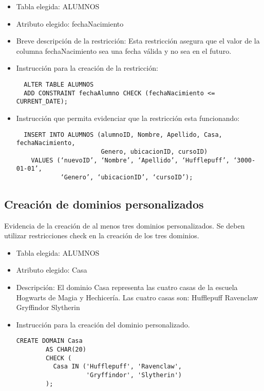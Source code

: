 \begin{itemize} 
  \item Tabla elegida: ALUMNOS 
  \item Atributo elegido: fechaNacimiento 
  \item Breve descripción de la restricción: Esta restricción asegura que el valor de la columna fechaNacimiento sea una fecha válida y no sea en el futuro.
  \item Instrucción para la creación de la restricción: 
  \begin{verbatim} 
  ALTER TABLE ALUMNOS 
  ADD CONSTRAINT fechaAlumno CHECK (fechaNacimiento <= CURRENT_DATE); 
  \end{verbatim} 
  \item Instrucción que permita evidenciar que la restricción esta funcionando: 
  \begin{verbatim} 
  INSERT INTO ALUMNOS (alumnoID, Nombre, Apellido, Casa, fechaNacimiento, 
                       Genero, ubicacionID, cursoID) 
    VALUES (‘nuevoID’, ‘Nombre’, ‘Apellido’, ‘Hufflepuff’, ‘3000-01-01’, 
            ‘Genero’, ‘ubicacionID’, ‘cursoID’); 
  \end{verbatim} 
\end{itemize}


\subsection{Creación de dominios personalizados}

Evidencia de la creación de al menos tres dominios personalizados. Se deben utilizar restricciones check en la creación de los tres dominios.
\begin{itemize}
    \item Tabla elegida: ALUMNOS
    \item Atributo elegido: Casa
    \item Descripción: El dominio Casa representa las cuatro casas de la escuela Hogwarts de Magia y Hechicería. Las cuatro casas son: Hufflepuff Ravenclaw Gryffindor Slytherin
    \item Instrucción para la creación del dominio personalizado.
    \begin{lstlisting}[caption={Tablas para la BdDatos}, label={lst:sql_estadios}]
      CREATE DOMAIN Casa
        AS CHAR(20)
        CHECK (
          Casa IN ('Hufflepuff', 'Ravenclaw', 
                   'Gryffindor', 'Slytherin')
        );      
    \end{lstlisting}
\end{itemize}


